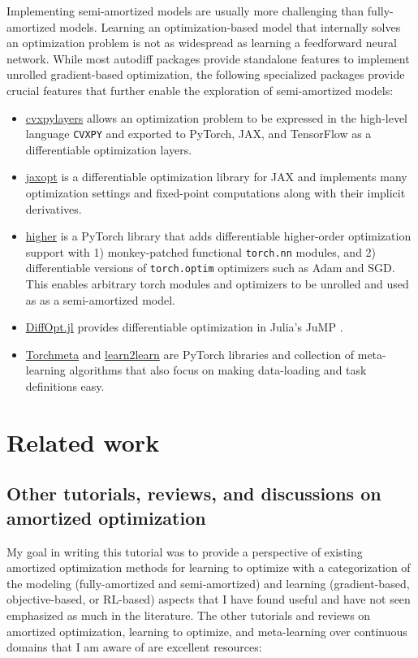 \documentclass[twoside,11pt]{article}
\begin{document}
Implementing semi-amortized models are usually more challenging
than fully-amortized models. Learning an optimization-based
model that internally solves an optimization problem is
not as widespread as learning a feedforward neural network.
While most autodiff packages provide standalone features to implement
unrolled gradient-based optimization, the following specialized
packages provide crucial features that further enable the
exploration of semi-amortized models:
\begin{itemize}
\item \href{https://github.com/cvxgrp/cvxpylayers}{cvxpylayers}
  \citep{agrawal2019differentiable}
  allows an optimization problem to be expressed in the
  high-level language \verb!CVXPY! \citep{diamond2016cvxpy}
  and exported to PyTorch, JAX, and TensorFlow
  as a differentiable optimization layers.
\item \href{https://github.com/google/jaxopt}{jaxopt}
  \citep{blondel2021efficient}
  is a differentiable optimization library for JAX
  and implements many optimization settings and fixed-point
  computations along with their implicit derivatives.
\item \href{https://github.com/facebookresearch/higher}{higher}
  \citep{grefenstette2019generalized}
  is a PyTorch library that adds differentiable higher-order
  optimization support with
  1) monkey-patched functional \verb!torch.nn! modules,
  and 2) differentiable versions of \verb!torch.optim!
  optimizers such as Adam and SGD.
  This enables arbitrary torch modules and optimizers
  to be unrolled and used as as a semi-amortized model.
\item \href{https://github.com/jump-dev/DiffOpt.jl}{DiffOpt.jl}
  provides differentiable optimization in Julia's JuMP
  \citep{DunningHuchetteLubin2017}.
\item \href{https://github.com/tristandeleu/pytorch-meta}{Torchmeta}
  \citep{deleu2019torchmeta}
  and
  \href{http://learn2learn.net}{learn2learn}
  \citep{arnold2020learn2learn}
  are PyTorch libraries and collection of meta-learning
  algorithms that also focus on making data-loading
  and task definitions easy.
\end{itemize}

\section{Related work}
\subsection{Other tutorials, reviews, and discussions
  on amortized optimization}
My goal in writing this tutorial was to provide a perspective
of existing amortized optimization methods for learning
to optimize with a categorization of the
modeling (fully-amortized and semi-amortized)
and learning (gradient-based, objective-based, or RL-based)
aspects that I have found useful and have not seen
emphasized as much in the literature.
The other tutorials and reviews on
amortized optimization, learning to optimize, and
meta-learning over continuous domains
that I am aware of are excellent resources:
\end{document}
